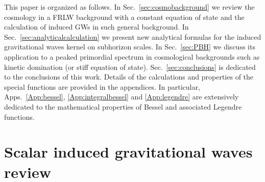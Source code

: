 \documentclass[aps,10pt,prd,groupedaddress,nofootinbib,notitlepage,eqsecnum,preprintnumbers]{revtex4-1}
\begin{document}
This paper is organized as follows. In Sec.~\ref{sec:cosmobackground} we review the cosmology in a FRLW background with a constant equation of state and the calculation of induced GWs in such general background. In Sec.~\ref{sec:analyticalcalculation} we present new analytical formulas for the induced gravitational waves kernel on subhorizon scales. In Sec.~\ref{sec:PBH} we discuss its application to a peaked primordial spectrum in cosmological backgrounds such as kinetic domination (or stiff equation of state). Sec.~\ref{sec:conclusions} is dedicated to the conclusions of this work. Details of the calculations and properties of the special functions are provided in the appendices. In particular, Apps.~\ref{App:bessel}, \ref{App:integralbessel} and \ref{App:legendre} are extensively dedicated to the mathematical properties of Bessel and associated Legendre functions.

\section{Scalar induced gravitational waves review \label{sec:cosmobackground}}
\end{document}
